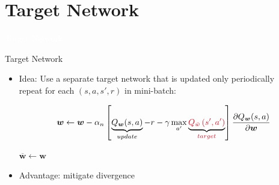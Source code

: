 \documentclass[11pt,table]{beamer}
\begin{document}
\section{Target Network}
{
\begin{frame}
\centering
\Huge
\textcolor{white}{Target Network}
\thispagestyle{empty}
\end{frame}
}

\begin{frame}{Target Network}


    \begin{itemize}
        \item Idea: Use a separate target network that is updated only periodically\\[2ex]
				repeat for each $(s,a,s',r)$  in mini-batch:

$$
\boldsymbol{w} \leftarrow \boldsymbol{w}-\alpha_{n}\left[\underbrace{Q_{\boldsymbol{w}}(s, a)}_{update}-r-\gamma \max _{a^{\prime}} \underbrace{\textcolor{red1}{Q_{\bar{w}}\left(s^{\prime}, a^{\prime}\right)}}_{\textcolor{red1}{target}}\right] \frac{\partial Q_{\boldsymbol{w}}(s, a)}{\partial \boldsymbol{w}}
$$

$\overline{\boldsymbol{w}} \leftarrow \boldsymbol{w}$

 \item Advantage: mitigate divergence 
    \end{itemize}
    
\end{frame}
\end{document}
